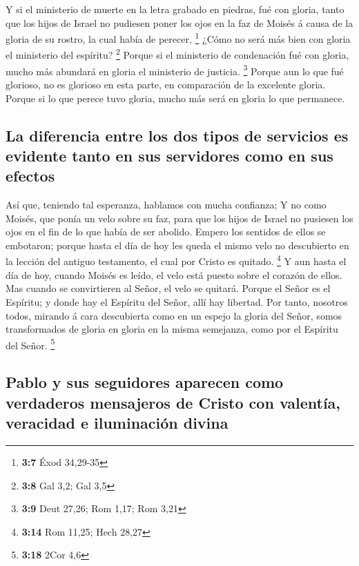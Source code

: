  Y si el ministerio de muerte en la letra grabado en
piedras, fué con gloria, tanto que los hijos de Israel no pudiesen poner
los ojos en la faz de Moisés á causa de la gloria de su rostro, la cual
había de perecer, \footnote{\textbf{3:7} Éxod 34,29-35} 
¿Cómo no será más bien con gloria el ministerio del espíritu?
\footnote{\textbf{3:8} Gal 3,2; Gal 3,5}  Porque si el
ministerio de condenación fué con gloria, mucho más abundará en gloria
el ministerio de justicia. \footnote{\textbf{3:9} Deut 27,26; Rom 1,17;
  Rom 3,21}  Porque aun lo que fué glorioso, no es glorioso
en esta parte, en comparación de la excelente gloria. 
Porque si lo que perece tuvo gloria, mucho más será en gloria lo que
permanece.

\hypertarget{la-diferencia-entre-los-dos-tipos-de-servicios-es-evidente-tanto-en-sus-servidores-como-en-sus-efectos}{%
\subsection{La diferencia entre los dos tipos de servicios es evidente
tanto en sus servidores como en sus
efectos}\label{la-diferencia-entre-los-dos-tipos-de-servicios-es-evidente-tanto-en-sus-servidores-como-en-sus-efectos}}

 Así que, teniendo tal esperanza, hablamos con mucha
confianza;  Y no como Moisés, que ponía un velo sobre su
faz, para que los hijos de Israel no pusiesen los ojos en el fin de lo
que había de ser abolido.  Empero los sentidos de ellos se
embotaron; porque hasta el día de hoy les queda el mismo velo no
descubierto en la lección del antiguo testamento, el cual por Cristo es
quitado. \footnote{\textbf{3:14} Rom 11,25; Hech 28,27}  Y
aun hasta el día de hoy, cuando Moisés es leído, el velo está puesto
sobre el corazón de ellos.  Mas cuando se convirtieren al
Señor, el velo se quitará.  Porque el Señor es el Espíritu;
y donde hay el Espíritu del Señor, allí hay libertad.  Por
tanto, nosotros todos, mirando á cara descubierta como en un espejo la
gloria del Señor, somos transformados de gloria en gloria en la misma
semejanza, como por el Espíritu del Señor. \footnote{\textbf{3:18} 2Cor
  4,6}

\hypertarget{pablo-y-sus-seguidores-aparecen-como-verdaderos-mensajeros-de-cristo-con-valentuxeda-veracidad-e-iluminaciuxf3n-divina}{%
\subsection{Pablo y sus seguidores aparecen como verdaderos mensajeros
de Cristo con valentía, veracidad e iluminación
divina}\label{pablo-y-sus-seguidores-aparecen-como-verdaderos-mensajeros-de-cristo-con-valentuxeda-veracidad-e-iluminaciuxf3n-divina}}

